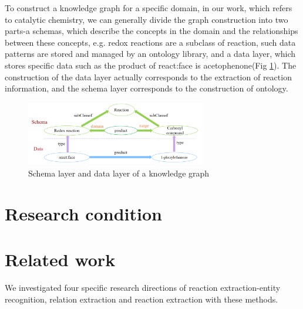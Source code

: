 \documentclass[%
 aip,
 jmp,%
 amsmath,amssymb,
 reprint,%
]{revtex4-2}
\begin{document}
To construct a knowledge graph for a specific domain, in our work, which refers to catalytic chemistry, 
we can generally divide the graph construction into two parts-a schemas, which describe the concepts in the domain and the relationships 
between these concepts, e.g. redox reactions are a subclass of reaction, such data patterns are stored and 
managed by an ontology library, and a data layer, which stores specific data such as the 
product of react:face is acetophenone(Fig \ref{ Fig.3 }). The construction of the data layer actually 
corresponds to the extraction of reaction information, and the schema layer corresponds 
to the construction of ontology\cite{eibeck2019j}. 

\begin{figure}[htbp]
 \centering
 \includegraphics[width=0.7\textwidth]{figure/3.png}
 \caption{ Schema layer and data layer of a knowledge graph }
 \label{ Fig.3 }
\end{figure}

\section{Research condition}




\section{Related work}
We investigated four specific research directions of reaction extraction-entity recognition, relation extraction
and reaction extraction with these methods.
\end{document}
